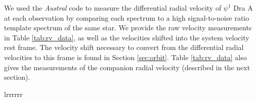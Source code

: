 \documentclass[twocolumn]{emulateapj}
\begin{document}
We used the \emph{Austral} code \citep{Endl2000} to measure the differential radial velocity of $\psi^1$ Dra A at each observation by comparing each spectrum to a high signal-to-noise ratio template spectrum of the same star. We provide the raw velocity measurements in Table \ref{tab:rv_data}, as well as the velocities shifted into the system velocity rest frame. The velocity shift necessary to convert from the differential radial velocities to this frame is found in Section \ref{sec:orbit}. Table \ref{tab:rv_data} also gives the measurements of the companion radial velocity (described in the next section).



\begin{deluxetable}{lrrrrrr}
\tabletypesize{\footnotesize}
\tablewidth{0pt}

\startdata


\end{deluxetable}
\end{document}
